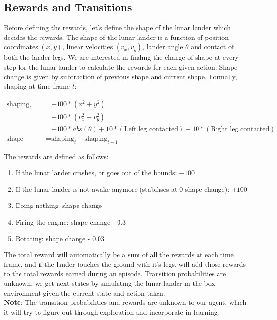 \subsection{Rewards and Transitions}

Before defining the rewards, let's define the shape of the lunar lander which decides the rewards. The shape of the lunar lander is a function of position coordinates $(x, y)$, linear velocities $(v_x, v_y)$, lander angle $\theta$ and contact of both the lander legs. We are interested in finding the change of shape at every step for the lunar lander to calculate the rewards for each given action. Shape change is given by subtraction of previous shape and current shape. Formally, shaping at time frame $t$:

\begin{align*}
\text{shaping}_{t} = &- 100*(x^2 + y^2) \\
           & - 100*(v_x^2 + v_y^2) \\
            &- 100*abs(\theta) + 10*(\text{Left leg contacted}) + 10*(\text{Right leg contacted}) \\
\text{shape change} = & \text{shaping}_t - \text{shaping}_{t-1}
\end{align*}

The rewards are defined as follows:

\begin{enumerate}
\item If the lunar lander crashes, or goes out of the bounds: $-100$
\item If the lunar lander is not awake anymore (stabilises at 0 shape change): $+100$
\item Doing nothing: shape change 
\item Firing the engine: shape change - 0.3
\item Rotating: shape change - 0.03
\end{enumerate}

The total reward will automatically be a sum of all the rewards at each time frame, and if the lander touches the ground with it's legs, will add those rewards to the total rewards earned during an episode. Transition probabilities are unknown, we get next states by simulating the lunar lander in the box environment given the current state and action taken. \\

\textbf{Note}: The transition probabilities and rewards are unknown to our agent, which it will try to figure out through exploration and incorporate in learning. 